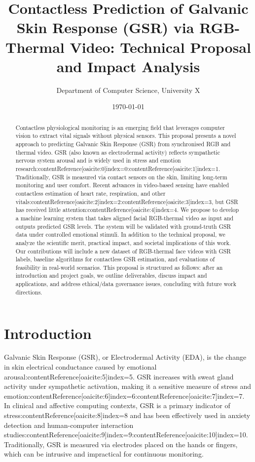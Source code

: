 \documentclass[12pt]{article}
\title{\textbf{Contactless Prediction of Galvanic Skin Response (GSR) via RGB-Thermal Video: Technical Proposal and Impact Analysis}}
\author{Department of Computer Science, University X}
\date{\today}
\begin{document}
    \maketitle

    \begin{abstract}
        Contactless physiological monitoring is an emerging field that leverages computer vision to extract vital signals without physical sensors. This proposal presents a novel approach to predicting Galvanic Skin Response (GSR) from synchronised RGB and thermal video. GSR (also known as electrodermal activity) reflects sympathetic nervous system arousal and is widely used in stress and emotion research:contentReference[oaicite:0]{index=0}:contentReference[oaicite:1]{index=1}. Traditionally, GSR is measured via contact sensors on the skin, limiting long-term monitoring and user comfort. Recent advances in video-based sensing have enabled contactless estimation of heart rate, respiration, and other vitals:contentReference[oaicite:2]{index=2}:contentReference[oaicite:3]{index=3}, but GSR has received little attention:contentReference[oaicite:4]{index=4}. We propose to develop a machine learning system that takes aligned facial RGB-thermal video as input and outputs predicted GSR levels. The system will be validated with ground-truth GSR data under controlled emotional stimuli. In addition to the technical proposal, we analyze the scientific merit, practical impact, and societal implications of this work. Our contributions will include a new dataset of RGB-thermal face videos with GSR labels, baseline algorithms for contactless GSR estimation, and evaluations of feasibility in real-world scenarios. This proposal is structured as follows: after an introduction and project goals, we outline deliverables, discuss impact and applications, and address ethical/data governance issues, concluding with future work directions.
    \end{abstract}

    \tableofcontents


    \section{Introduction}
    Galvanic Skin Response (GSR), or Electrodermal Activity (EDA), is the change in skin electrical conductance caused by emotional arousal:contentReference[oaicite:5]{index=5}. GSR increases with sweat gland activity under sympathetic activation, making it a sensitive measure of stress and emotion:contentReference[oaicite:6]{index=6}:contentReference[oaicite:7]{index=7}. In clinical and affective computing contexts, GSR is a primary indicator of stress:contentReference[oaicite:8]{index=8} and has been effectively used in anxiety detection and human-computer interaction studies:contentReference[oaicite:9]{index=9}:contentReference[oaicite:10]{index=10}. Traditionally, GSR is measured via electrodes placed on the hands or fingers, which can be intrusive and impractical for continuous monitoring.
\end{document}
